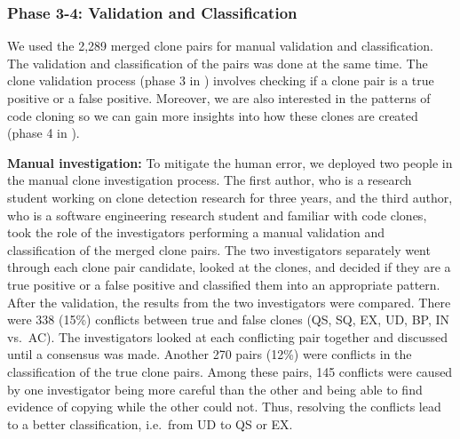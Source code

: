 \documentclass[10pt,journal,compsoc]{IEEEtran}
\begin{document}
\subsubsection{Phase 3-4: Validation and Classification}
We used the 2,289 merged clone pairs for
manual validation and classification.
The validation and classification of the pairs was done at the same time. 
The clone validation process (phase 3 in ) involves checking 
if a clone pair is a true positive or a false positive. 
Moreover, we are also interested in 
the patterns of code cloning so we can gain more insights into 
how these clones are created (phase 4 in ). 

\textbf{Manual investigation:} 
To mitigate the human error, we deployed two people in the manual clone
investigation process. The first author, who is a research student working on
clone detection research for three years, and the third author, who is a
software engineering research student and familiar with code clones, took the
role of the investigators performing a manual validation and classification of
the merged clone pairs. The two investigators separately went through each clone
pair candidate, looked at the clones, and decided if they are a true positive or
a false positive and classified them into an appropriate pattern. After the
validation, the results from the two investigators were compared. 
There were 338 (15\%) conflicts between 
true and false clones (QS, SQ, EX, UD, BP, IN vs.~AC).
The investigators looked at each conflicting pair together and
discussed until a consensus was made. 
Another 270 pairs (12\%) were
conflicts in the classification of
the true clone pairs. Among these pairs, 145 conflicts were caused by
one investigator being more careful than the other and being able to find evidence of 
copying while the other could not. Thus, resolving the conflicts lead to a better classification,
 i.e.~from UD to QS or EX.

\end{document}
